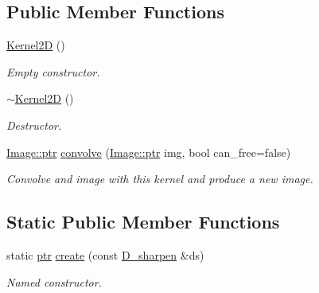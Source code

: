 \subsection*{Public Member Functions}
\begin{DoxyCompactItemize}
\item 
\hyperlink{class_photo_finish_1_1_kernel2_d_a41562fb9c80ee1aed47879347df24b4f}{Kernel2D} ()
\begin{DoxyCompactList}\small\item\em Empty constructor. \end{DoxyCompactList}\item 
\hyperlink{class_photo_finish_1_1_kernel2_d_a1ca692f0ba0f7d4ceb7870cbc00e4ec1}{$\sim$\+Kernel2D} ()
\begin{DoxyCompactList}\small\item\em Destructor. \end{DoxyCompactList}\item 
\hyperlink{class_photo_finish_1_1_image_ab336203305ed3a1397d7245063353b5a}{Image\+::ptr} \hyperlink{class_photo_finish_1_1_kernel2_d_a3ebc380c0b20cb9e1f0abbc53d35f451}{convolve} (\hyperlink{class_photo_finish_1_1_image_ab336203305ed3a1397d7245063353b5a}{Image\+::ptr} img, bool can\+\_\+free=false)
\begin{DoxyCompactList}\small\item\em Convolve and image with this kernel and produce a new image. \end{DoxyCompactList}\end{DoxyCompactItemize}
\subsection*{Static Public Member Functions}
\begin{DoxyCompactItemize}
\item 
static \hyperlink{class_photo_finish_1_1_kernel2_d_a7a209c34b3c8edb54835f1bab1244970}{ptr} \hyperlink{class_photo_finish_1_1_kernel2_d_a1b28832e16ba150a49138caef3f4f918}{create} (const \hyperlink{class_photo_finish_1_1_d__sharpen}{D\+\_\+sharpen} \&ds)
\begin{DoxyCompactList}\small\item\em Named constructor. \end{DoxyCompactList}\end{DoxyCompactItemize}
